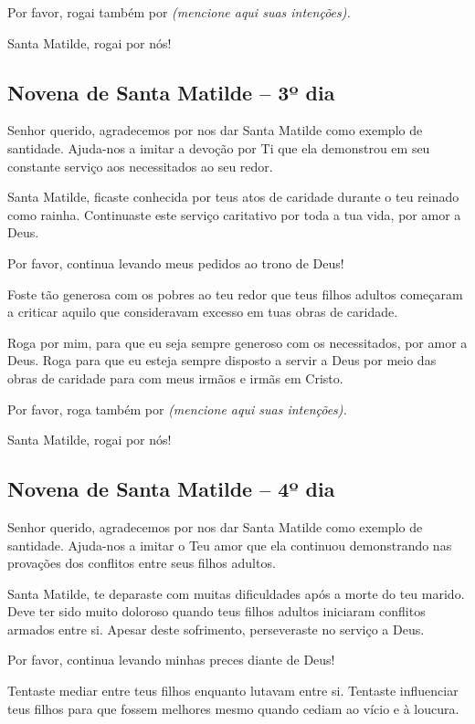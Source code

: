 Por favor, rogai também por \textit{(mencione aqui suas intenções).}

Santa Matilde, rogai por nós!


\subsection{Novena de Santa Matilde – 3º dia}



Senhor querido, agradecemos por nos dar Santa Matilde como exemplo de santidade. Ajuda-nos a imitar a devoção por Ti que ela demonstrou em seu constante serviço aos necessitados ao seu redor.

Santa Matilde, ficaste conhecida por teus atos de caridade durante o teu reinado como rainha. Continuaste este serviço caritativo por toda a tua vida, por amor a Deus.

Por favor, continua levando meus pedidos ao trono de Deus!

Foste tão generosa com os pobres ao teu redor que teus filhos adultos começaram a criticar aquilo que consideravam excesso em tuas obras de caridade.

Roga por mim, para que eu seja sempre generoso com os necessitados, por amor a Deus. Roga para que eu esteja sempre disposto a servir a Deus por meio das obras de caridade para com meus irmãos e irmãs em Cristo.

Por favor, roga também por \textit{(mencione aqui suas intenções).}

Santa Matilde, rogai por nós!


\subsection{Novena de Santa Matilde – 4º dia}



Senhor querido, agradecemos por nos dar Santa Matilde como exemplo de santidade. Ajuda-nos a imitar o Teu amor que ela continuou demonstrando nas provações dos conflitos entre seus filhos adultos.

Santa Matilde, te deparaste com muitas dificuldades após a morte do teu marido. Deve ter sido muito doloroso quando teus filhos adultos iniciaram conflitos armados entre si. Apesar deste sofrimento, perseveraste no serviço a Deus.

Por favor, continua levando minhas preces diante de Deus!

Tentaste mediar entre teus filhos enquanto lutavam entre si. Tentaste influenciar teus filhos para que fossem melhores mesmo quando cediam ao vício e à loucura.


